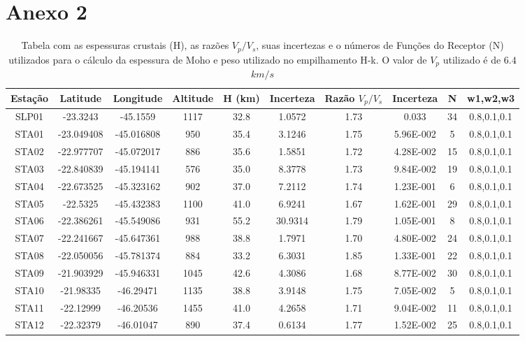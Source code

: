 \chapter*{Anexo 2}
\begin{table}[!ht]
\begin{center}
\small
\caption{Tabela com as espessuras crustais (H), as razões $V_{p}/V_{s}$, suas incertezas e o números de Funções do Receptor (N) utilizados para o cálculo da espessura de Moho e peso utilizado no empilhamento H-k. O valor de $V_{p}$ utilizado é de $6.4$ $km/s$}
\label{tabelaMoho}
\begin{tabular}{| c | c | c | c | c | c | c | c | c | c |}
\hline
{\textbf{Estação}} & {\textbf{Latitude}} & {\textbf{Longitude}} & {\textbf{Altitude}} & {\textbf{H (km)}} & {\textbf{Incerteza}} & {\textbf{Razão $V_{p}/V_{s}$}} & {\textbf{Incerteza}} & {\textbf{N}} & {\textbf{w1,w2,w3}}\\
\hline 
SLP01 & -23.3243 & -45.1559 & 1117 & 32.8 & 1.0572 & 1.73 & 0.033 & 34 & 0.8,0.1,0.1\\
STA01 & -23.049408 & -45.016808 & 950 & 35.4 & 3.1246 & 1.75 & 5.96E-002 & 5 & 0.8,0.1,0.1\\
STA02 & -22.977707 & -45.072017 & 886 & 35.6 & 1.5851 & 1.72 & 4.28E-002 & 15 & 0.8,0.1,0.1\\
STA03 & -22.840839 & -45.194141 & 576 & 35.0 & 8.3778 & 1.73 & 9.84E-002 & 19 & 0.8,0.1,0.1\\
STA04 & -22.673525 & -45.323162 & 902 & 37.0 & 7.2112 & 1.74 & 1.23E-001 & 6 & 0.8,0.1,0.1\\
STA05 & -22.5325 & -45.432383 & 1100 & 41.0 & 6.9241 & 1.67 & 1.62E-001 & 29 & 0.8,0.1,0.1\\
STA06 & -22.386261 & -45.549086 & 931 & 55.2 & 30.9314 & 1.79 & 1.05E-001 & 8 & 0.8,0.1,0.1\\
STA07 & -22.241667 & -45.647361 & 988 & 38.8 & 1.7971 & 1.70 & 4.80E-002 & 24 & 0.8,0.1,0.1\\
STA08 & -22.050056 & -45.781374 & 884 & 33.2 & 6.3031 & 1.85 & 1.33E-001 & 22 & 0.8,0.1,0.1\\
STA09 & -21.903929 & -45.946331 & 1045 & 42.6 & 4.3086 & 1.68 & 8.77E-002 & 30 & 0.8,0.1,0.1\\
STA10 & -21.98335 & -46.29471 & 1135 & 38.8 & 3.9148 & 1.75 & 7.05E-002 & 5 & 0.8,0.1,0.1\\
STA11 & -22.12999 & -46.20536 & 1455 & 41.0 & 4.2658 & 1.71 & 9.04E-002 & 11 & 0.8,0.1,0.1\\
STA12 & -22.32379 & -46.01047 & 890 & 37.4 & 0.6134 & 1.77 & 1.52E-002 & 25 & 0.8,0.1,0.1\\

\end{tabular}
\end{center}
\end{table}

